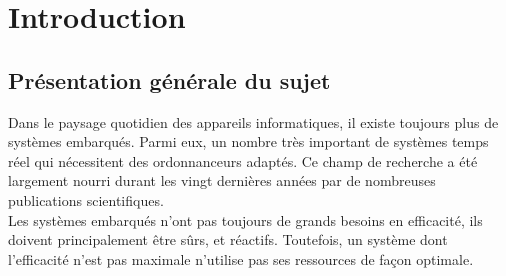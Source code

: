 \documentclass[11pt,a4paper,oneside]{report}
\begin{document}
%


\thispagestyle{empty} 
\setcounter{page}{0}
\tableofcontents




\chapter{Introduction}{}
\setcounter{page}{1}


\section{Présentation générale du sujet}

Dans le paysage quotidien des appareils informatiques, il existe toujours plus de systèmes embarqués. 
Parmi eux, un nombre très important de systèmes temps réel qui 
nécessitent des ordonnanceurs adaptés. 
Ce champ de recherche a été largement nourri durant les vingt dernières années par de nombreuses publications scientifiques. \\

Les systèmes embarqués n'ont pas toujours de grands besoins en efficacité, 
ils doivent principalement être sûrs, et réactifs. 
Toutefois, un système dont l'efficacité n'est pas maximale n'utilise pas 
ses ressources de façon optimale. 
\end{document}
